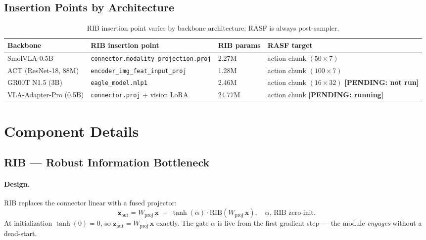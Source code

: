 \documentclass[11pt,a4paper]{article}
\newcommand{\pending}[1]{{\color{pendingcolor}\textbf{[PENDING: #1]}}}
\begin{document}
\subsection{Insertion Points by Architecture}

\begin{table}[H]
\centering
\caption{RIB insertion point varies by backbone architecture; RASF is always post-sampler.}
\small
\begin{tabular}{llll}
\toprule
Backbone & RIB insertion point & RIB params & RASF target \\
\midrule
SmolVLA-0.5B & \texttt{connector.modality\_projection.proj} & 2.27M & action chunk $(50\!\times\!7)$ \\
ACT (ResNet-18, 88M) & \texttt{encoder\_img\_feat\_input\_proj} & 1.28M & action chunk $(100\!\times\!7)$ \\
GR00T N1.5 (3B) & \texttt{eagle\_model.mlp1} & 2.46M & action chunk $(16\!\times\!32)$ \pending{not run} \\
VLA-Adapter-Pro (0.5B) & \texttt{connector.proj} + vision LoRA & 24.77M & action chunk \pending{running} \\
\bottomrule
\end{tabular}
\end{table}

\section{Component Details}
\label{sec:components}

\subsection{RIB — Robust Information Bottleneck}

\paragraph{Design.}
RIB replaces the connector linear with a fused projector:
\begin{equation}
  \mathbf{z}_{\text{out}} = W_{\text{proj}}\,\mathbf{x} \;+\; \tanh(\alpha)\cdot\mathrm{RIB}(W_{\text{proj}}\,\mathbf{x}),
  \quad \alpha,\,\mathrm{RIB} \text{ zero-init.}
\end{equation}
At initialization $\tanh(0)=0$, so $\mathbf{z}_{\text{out}} = W_{\text{proj}}\,\mathbf{x}$ exactly.
The gate $\alpha$ is live from the first gradient step — the module \emph{engages} without
a dead-start.
\end{document}
